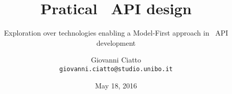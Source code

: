 \documentclass{beamer}
\title{Pratical \restful\ API design}
\subtitle{Exploration over technologies enabling a Model-First approach in \restful\ API development}
\author[G. Ciatto]{Giovanni Ciatto \\ \texttt{giovanni.ciatto@studio.unibo.it}}
\date{May 18, 2016}
\institute[UNIBO]{University of Bologna \\ Computer Science and Engineering}
\begin{document}
\frame{\titlepage}






\end{document}
